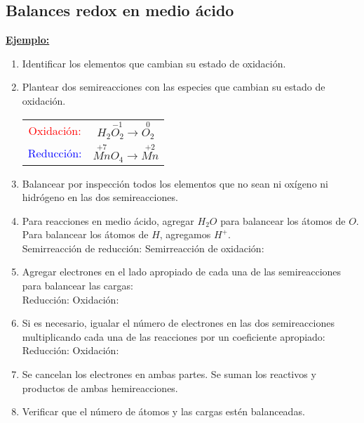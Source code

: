     \subsection{Balances redox en medio ácido}
    \textbf{\underline{Ejemplo:}}
    \begin{enumerate}
        \item Identificar los elementos que cambian su estado de oxidación.
        \item Plantear dos semireacciones con las especies que cambian su estado de oxidación.
            \begin{center}
                \begin{tabular}{cc}
                    \multicolumn{1}{c}{\textcolor{red}{Oxidación:}} &
                    \multicolumn{1}{c}{$H_2\overset{-1}{O_2} \rightarrow \overset{0}{O_2}$} \\[5pt]
                    \multicolumn{1}{c}{\textcolor{blue}{Reducción:}} &
                    \multicolumn{1}{c}{$\overset{+7}{Mn}O_4 \rightarrow \overset{+2}{Mn}$} \\
                \end{tabular}
            \end{center}
        \item Balancear por inspección todos los elementos que no sean ni oxígeno ni hidrógeno en las dos semireacciones.
        \item Para reacciones en medio ácido, agregar $H_2O$ para balancear los átomos de $O$. Para balancear los átomos de $H$, agregamos $H^+.$ \\
        Semirreacción de reducción:
        Semirreacción de oxidación:
    \item Agregar electrones en el lado apropiado de cada una de las semireacciones para balancear las cargas: \\[5pt]
        Reducción:
        Oxidación:
    \item Si es necesario, igualar el número de electrones en las dos semireacciones multiplicando cada una de las reacciones por un coeficiente apropiado: \\[5pt]
        Reducción:
        \columnbreak{}
        Oxidación:

    \item Se cancelan los electrones en ambas partes. Se suman los reactivos y productos de ambas hemireacciones.
    \item Verificar que el número de átomos y las cargas estén balanceadas.
    \end{enumerate}

